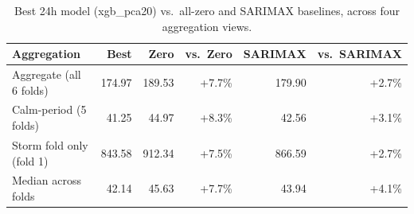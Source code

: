 \begin{table}[ht]
\centering
\caption{Best 24h model (xgb\_pca20) vs.\ all-zero and SARIMAX baselines, across four aggregation views.}
\label{tab:headline24}
\small
\begin{tabular}{lrrrrr}
\toprule
Aggregation & Best & Zero & vs.\ Zero & SARIMAX & vs.\ SARIMAX \\
\midrule
  Aggregate (all 6 folds) & 174.97 & 189.53 & +7.7\% & 179.90 & +2.7\% \\
  Calm-period (5 folds) & 41.25 & 44.97 & +8.3\% & 42.56 & +3.1\% \\
  Storm fold only (fold 1) & 843.58 & 912.34 & +7.5\% & 866.59 & +2.7\% \\
  Median across folds & 42.14 & 45.63 & +7.7\% & 43.94 & +4.1\% \\
\bottomrule
\end{tabular}
\end{table}
